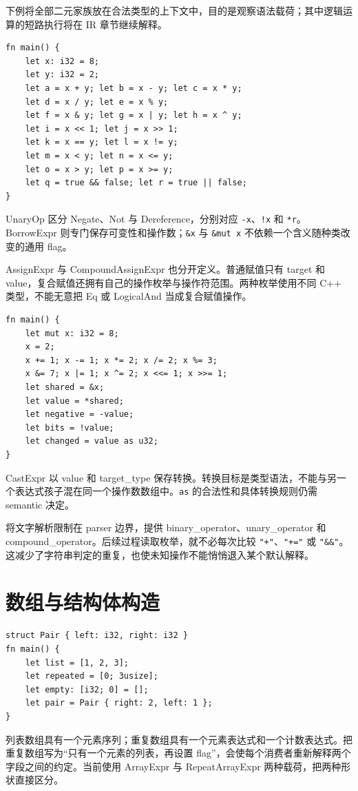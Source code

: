 下例将全部二元家族放在合法类型的上下文中，目的是观察语法载荷；其中逻辑运算的短路执行将在 IR 章节继续解释。
\begin{lstlisting}[language=Rustless]
fn main() {
    let x: i32 = 8;
    let y: i32 = 2;
    let a = x + y; let b = x - y; let c = x * y;
    let d = x / y; let e = x % y;
    let f = x & y; let g = x | y; let h = x ^ y;
    let i = x << 1; let j = x >> 1;
    let k = x == y; let l = x != y;
    let m = x < y; let n = x <= y;
    let o = x > y; let p = x >= y;
    let q = true && false; let r = true || false;
}
\end{lstlisting}
UnaryOp 区分 Negate、Not 与 Dereference，分别对应 \texttt{-x}、\texttt{!x} 和 \texttt{*r}。BorrowExpr 则专门保存可变性和操作数；\texttt{\&x} 与 \texttt{\&mut x} 不依赖一个含义随种类改变的通用 flag。

AssignExpr 与 CompoundAssignExpr 也分开定义。普通赋值只有 target 和 value，复合赋值还拥有自己的操作枚举与操作符范围。两种枚举使用不同 C++ 类型，不能无意把 Eq 或 LogicalAnd 当成复合赋值操作。
\begin{lstlisting}[language=Rustless]
fn main() {
    let mut x: i32 = 8;
    x = 2;
    x += 1; x -= 1; x *= 2; x /= 2; x %= 3;
    x &= 7; x |= 1; x ^= 2; x <<= 1; x >>= 1;
    let shared = &x;
    let value = *shared;
    let negative = -value;
    let bits = !value;
    let changed = value as u32;
}
\end{lstlisting}
CastExpr 以 value 和 target\_type 保存转换。转换目标是类型语法，不能与另一个表达式孩子混在同一个操作数数组中。\texttt{as} 的合法性和具体转换规则仍需 semantic 决定。

 将文字解析限制在 parser 边界，提供 binary\_operator、unary\_operator 和 compound\_operator。后续过程读取枚举，就不必每次比较 \texttt{"+"}、\texttt{"+="} 或 \texttt{"\&\&"}。这减少了字符串判定的重复，也使未知操作不能悄悄退入某个默认解释。

\section{数组与结构体构造}
\begin{lstlisting}[language=Rustless]
struct Pair { left: i32, right: i32 }
fn main() {
    let list = [1, 2, 3];
    let repeated = [0; 3usize];
    let empty: [i32; 0] = [];
    let pair = Pair { right: 2, left: 1 };
}
\end{lstlisting}
列表数组具有一个元素序列；重复数组具有一个元素表达式和一个计数表达式。把重复数组写为“只有一个元素的列表，再设置 flag”，会使每个消费者重新解释两个字段之间的约定。当前使用 ArrayExpr 与 RepeatArrayExpr 两种载荷，把两种形状直接区分。

